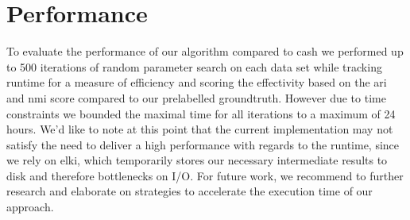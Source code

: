 \begin{figure}
\begin{minipage}[t]{.5\textwidth}
    \label{fig:my_label}
    \end{minipage}%
\end{figure}


\section{Performance}
 To evaluate the performance of our algorithm compared to \gls{cash} we performed up to 500 iterations of random parameter search on each data set while tracking runtime for a measure of efficiency and scoring the effectivity based on the \gls{ari} and \gls{nmi} score compared to our prelabelled groundtruth. However due to time constraints we bounded the maximal time for all iterations to a maximum of 24 hours. We’d like to note at this point that the current implementation may not satisfy the need to deliver a high performance with regards to the runtime, since we rely on \gls{elki}, which temporarily stores our necessary intermediate results to disk and therefore bottlenecks on I/O. For future work, we recommend to further research and elaborate on strategies to accelerate the execution time of our approach. 
 
\begin{table}[hb]
\centering
{}
\caption{}
\label{tab:reducedsetup}
\end{table}
 
